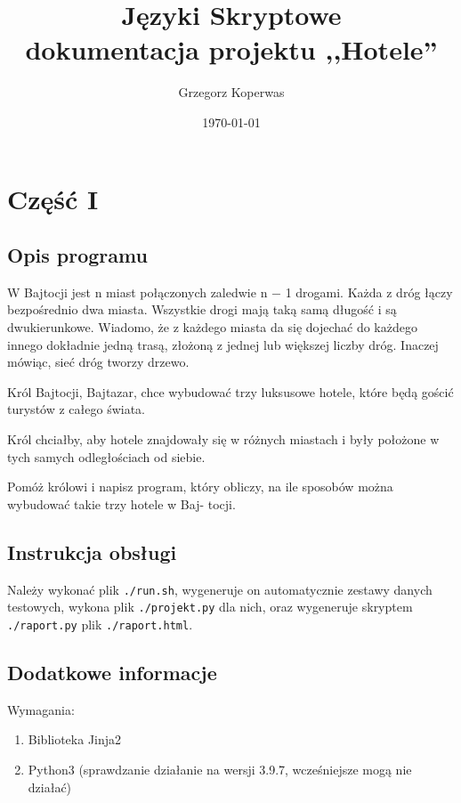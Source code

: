 \documentclass[12pt,a4paper]{article}
\begin{document}
	
	\title{Języki Skryptowe\\\small{dokumentacja projektu ,,Hotele''}}
	\author{Grzegorz Koperwas}
	\date{\today}

	\maketitle
	\newpage
	\section*{Część I}
	\subsection*{Opis programu}

    W Bajtocji jest n miast połączonych zaledwie n − 1 drogami. Każda z dróg łączy bezpośrednio dwa miasta.
    Wszystkie drogi mają taką samą długość i są dwukierunkowe. Wiadomo, że z każdego miasta da się dojechać
    do każdego innego dokładnie jedną trasą, złożoną z jednej lub większej liczby dróg. Inaczej mówiąc, sieć dróg
    tworzy drzewo.

    Król Bajtocji, Bajtazar, chce wybudować trzy luksusowe hotele, które będą gościć turystów z całego świata.

    Król chciałby, aby hotele znajdowały się w różnych miastach i były położone w tych samych odległościach od
    siebie.

    Pomóż królowi i napisz program, który obliczy, na ile sposobów można wybudować takie trzy hotele w Baj-
    tocji.

	\subsection*{Instrukcja obsługi}

    Należy wykonać plik \texttt{./run.sh}, wygeneruje on automatycznie zestawy
    danych testowych, wykona plik \texttt{./projekt.py} dla nich, oraz
    wygeneruje skryptem \texttt{./raport.py} plik \texttt{./raport.html}.

	\subsection*{Dodatkowe informacje}

    Wymagania:

    \begin{enumerate}
            \item Biblioteka Jinja2
            \item Python3 (sprawdzanie działanie na wersji 3.9.7, wcześniejsze mogą nie
                działać)
    \end{enumerate}
\end{document}

